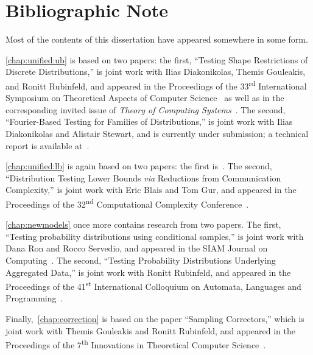 \chapter{Bibliographic Note} %
\thispagestyle{plain} %

\noindent Most of the contents of this dissertation have appeared somewhere in some form.

\cref{chap:unified:ub} is based on two papers: the first, ``Testing Shape Restrictions of Discrete Distributions,'' is joint work with Ilias Diakonikolas, Themis Gouleakis, and Ronitt Rubinfeld, and appeared in the Proceedings of the 33\textsuperscript{rd} International Symposium on Theoretical Aspects of Computer Science~\parencite{CDGR:16} as well as in the corresponding invited issue of \textit{Theory of Computing Systems}~\parencite{CDGR:17:journal}. The second, ``Fourier-Based Testing for Families of Distributions,'' is joint work with Ilias Diakonikolas and Alistair Stewart, and is currently under submission; a technical report is available at~\parencite{CanonneDS:17}.

\cref{chap:unified:lb} is again based on two papers: the first is~\parencite{CDGR:16}. The second, ``Distribution Testing Lower Bounds \textit{via} Reductions from Communication Complexity,'' is joint work with Eric Blais and Tom Gur, and appeared in the Proceedings of the 32\textsuperscript{nd} Computational Complexity Conference~\parencite{BCG:17}.

\cref{chap:newmodels} once more contains research from two papers. The first, ``Testing probability distributions using conditional samples,'' is joint work with Dana Ron and Rocco Servedio, and appeared in the SIAM Journal on Computing~\parencite{CRS:15}. The second, ``Testing Probability Distributions Underlying Aggregated Data,'' is joint work with Ronitt Rubinfeld, and appeared in the Proceedings of the 41\textsuperscript{st} International Colloquium on Automata, Languages and Programming~\parencite{CR:14}.

Finally,~\cref{chap:correction} is based on the paper ``Sampling Correctors,'' which is joint work with Themis Gouleakis and Ronitt Rubinfeld, and appeared in the Proceedings of the 7\textsuperscript{th} Innovations in Theoretical Computer Science~\parencite{CGR:16}.
